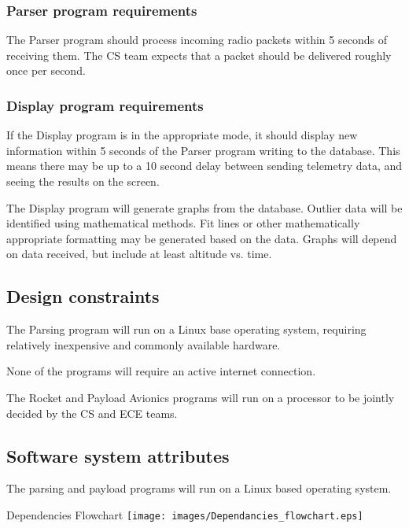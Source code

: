 \documentclass[onecolumn, draftclsnofoot, 10pt, compsoc]{IEEEtran}
\begin{document}
\subsubsection{Parser program requirements}
The Parser program should process incoming radio packets within 5 seconds of receiving them. The CS team expects that a packet should be delivered roughly once per second.

\subsubsection{Display program requirements}
If the Display program is in the appropriate mode, it should display new information within 5 seconds of the Parser program writing to the database.  This means there may be up to a 10 second delay between sending telemetry data, and seeing the results on the screen.

The Display program will generate graphs from the database. Outlier data will be identified using mathematical methods. Fit lines or other mathematically appropriate formatting may be generated based on the data. Graphs will depend on data received, but include at least altitude vs. time.

\subsection{Design constraints}
The Parsing program will run on a Linux base operating system, requiring relatively inexpensive and commonly available hardware.

None of the programs will require an active internet connection.

The Rocket and Payload Avionics programs will run on a processor to be jointly decided by the CS and ECE teams.

\subsection{Software system attributes}
The parsing and payload programs will run on a Linux based operating system.

\centering
Dependencies Flowchart
\texttt{[image: images/Dependancies\_flowchart.eps]}
\end{document}
